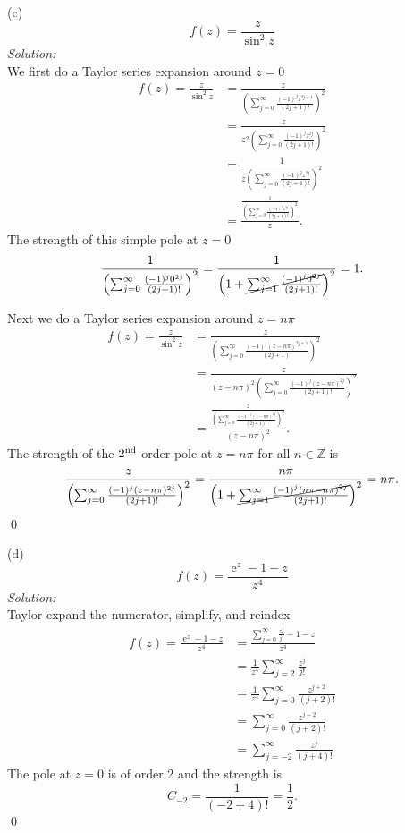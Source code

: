 \documentclass[10pt]{amsart}
\DeclareMathOperator{\E}{e}
\theoremstyle{nonumberplain}
\begin{document}
\begin{enumerate}[label={\bf {\arabic*}:}]
\noindent
(c)
$$
f(z) = \frac z {\sin^2 z}
$$
\textit{Solution:} \\
We first do a Taylor series expansion around $z= 0$
\begin{align*}
f(z) = \frac z {\sin^2 z}
	&= \frac z {\left(\sum_{j=0}^{\infty} \frac {(-1)^j z^{2j + 1}}{(2j + 1)!} \right)^2} \\
	&= \frac z {z^2 \left(\sum_{j=0}^{\infty} \frac {(-1)^j z^{2j}}{(2j + 1)!} \right)^2} \\
	&= \frac 1 {z \left(\sum_{j=0}^{\infty} \frac {(-1)^j z^{2j}}{(2j + 1)!} \right)^2} \\
	&= \frac {\frac{1}{\left(\sum_{j=0}^{\infty} \frac {(-1)^j z^{2j}}{(2j + 1)!} \right)^2}} {z }.
\end{align*}
The strength of this simple pole at $z = 0$
$$
\frac{1}{\left(\sum_{j=0}^{\infty} \frac {(-1)^j 0^{2j}}{(2j + 1)!} \right)^2}
	= \frac{1}{\left( 1 + \cancel{\sum_{j=1}^{\infty} \frac {(-1)^j 0^{2j}}{(2j + 1)!}} \right)^2}
	= 1.
$$


\noindent
Next we do a Taylor series expansion around $z= n\pi$
\begin{align*}
f(z) = \frac z {\sin^2 z}
	&= \frac z {\left(\sum_{j=0}^{\infty} \frac {(-1)^j (z - n\pi)^{2j + 1}}{(2j + 1)!} \right)^2} \\
	&= \frac z {(z - n\pi)^2 \left(\sum_{j=0}^{\infty} \frac {(-1)^j (z - n\pi)^{2j}}{(2j + 1)!} \right)^2} \\
	&= \frac {\frac z {\left(\sum_{j=0}^{\infty} \frac {(-1)^j (z - n\pi)^{2j}}{(2j + 1)!} \right)^2}} {(z - n\pi)^2}.
\end{align*}
The strength of the $2^{\rm nd}$ order pole at $z = n \pi$ for all $n \in \mathbb Z$ is
$$
\frac z {\left(\sum_{j=0}^{\infty} \frac {(-1)^j (z - n\pi)^{2j}}{(2j + 1)!} \right)^2}
	= \frac {n \pi} {\left( 1 + \cancel{\sum_{j=1}^{\infty} \frac {(-1)^j (n \pi - n\pi)^{2j}}{(2j + 1)!}} \right)^2}
	= n \pi.
$$
\qed \\
\newpage

\noindent
(d)
$$
f(z) = \frac {\E^z - 1 - z}{z^4}
$$
\textit{Solution:} \\
Taylor expand the numerator, simplify, and reindex
\begin{align*}
f(z) = \frac {\E^z - 1 - z}{z^4} &= \frac {\sum_{j=0}^\infty \frac {z^j} {j!} - 1 - z}{z^4} \\
	&= \frac 1 {z^4} \sum_{j=2}^\infty \frac {z^j} {j!} \\
	&= \frac 1 {z^4} \sum_{j=0}^\infty \frac {z^{j + 2}} {(j + 2)!} \\
	&= \sum_{j=0}^\infty \frac {z^{j - 2}} {(j + 2)!} \\
	&= \sum_{j=-2}^\infty \frac {z^{j}} {(j + 4)!}
\end{align*}
The pole at $z = 0$ is of order 2 and the strength is
$$
C_{-2} = \frac 1 {(-2 + 4)!} = \frac 1 2.
$$
\qed \\
\newpage


\end{enumerate}
\end{document}
